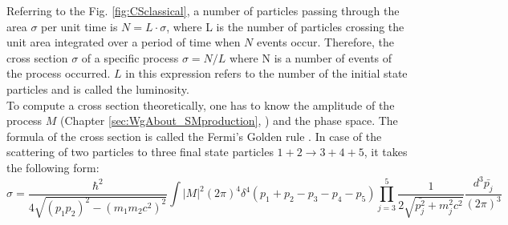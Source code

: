 Referring to the Fig. \ref{fig:CSclassical}, a number of particles passing through the area $\sigma$ per unit time is $N=L \cdot \sigma$, where L is the number of particles crossing the unit area integrated over a period of time when $N$ events occur. Therefore, the cross section $\sigma$ of a specific process $\sigma=N/L$ where N is a number of events of the process occurred. $L$ in this expression refers to the number of the initial state particles and is called the luminosity. \\
  



To compute a cross section theoretically, one has to know the amplitude of the process $M$  (Chapter \ref{sec:WgAbout_SMproduction}, \cite{ref_Griffiths}) and the phase space. The formula of the cross section is called the Fermi's Golden rule \cite{ref_Griffiths}. In case of the scattering of two particles to three final state particles $1+2\rightarrow 3+4+5$, it takes the following form:\\

\begin{equation}\label{eq:FermiGoldenRule}
\sigma = \frac{ \hbar^2 }{4\sqrt{(p_1p_2)^2-(m_1m_2c^2)^2}} \int |M|^2 (2\pi)^4 \delta^4(p_1+p_2-p_3-p_4-p_5) \prod_{j=3}^{5} \frac{1}{2 \sqrt{\bar{p_j^2}+m_j^2 c^2}}\frac{d^3\bar{p_j}}{(2\pi)^3}  
\end{equation}

